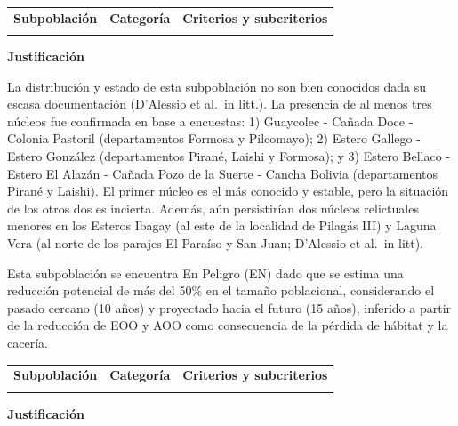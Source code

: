 \documentclass[
]{article}
\begin{document}
\begin{tabu} to 
\toprule
\textbf{Subpoblación} & \textbf{Categoría} & \textbf{Criterios y subcriterios}\\
\midrule
{} &  & \\
\bottomrule
\end{tabu}

\textbf{Justificación}

La distribución y estado de esta subpoblación no son bien conocidos dada
su escasa documentación (D'Alessio et al.~in litt.). La presencia de al
menos tres núcleos fue confirmada en base a encuestas: 1) Guaycolec -
Cañada Doce - Colonia Pastoril (departamentos Formosa y Pilcomayo); 2)
Estero Gallego - Estero González (departamentos Pirané, Laishi y
Formosa); y 3) Estero Bellaco - Estero El Alazán - Cañada Pozo de la
Suerte - Cancha Bolivia (departamentos Pirané y Laishi). El primer
núcleo es el más conocido y estable, pero la situación de los otros dos
es incierta. Además, aún persistirían dos núcleos relictuales menores en
los Esteros Ibagay (al este de la localidad de Pilagás III) y Laguna
Vera (al norte de los parajes El Paraíso y San Juan; D'Alessio et al.~in
litt).

Esta subpoblación se encuentra En Peligro (EN) dado que se estima una
reducción potencial de más del 50\% en el tamaño poblacional,
considerando el pasado cercano (10 años) y proyectado hacia el futuro
(15 años), inferido a partir de la reducción de EOO y AOO como
consecuencia de la pérdida de hábitat y la cacería.\vspace{0.5cm}

\begin{tabu} to 
\toprule
\textbf{Subpoblación} & \textbf{Categoría} & \textbf{Criterios y subcriterios}\\
\midrule
{} &  & \\
\bottomrule
\end{tabu}

\textbf{Justificación}
\end{document}
